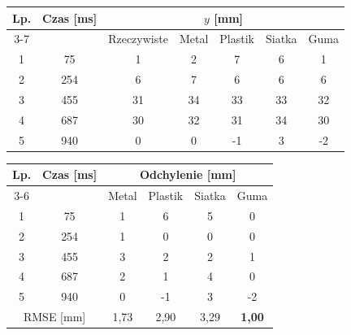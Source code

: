 \begin{tabular}{cc c cccc}
\toprule
Lp. & Czas [ms] & \multicolumn{5}{c}{$y$ [mm]} \\
\cmidrule(lr){3-7}
 &  & Rzeczywiste & Metal & Plastik & Siatka & Guma \\
\midrule
1 & 75 & 1 & 2 & 7 & 6 & 1 \\
2 & 254 & 6 & 7 & 6 & 6 & 6 \\
3 & 455 & 31 & 34 & 33 & 33 & 32 \\
4 & 687 & 30 & 32 & 31 & 34 & 30 \\
5 & 940 & 0 & 0 & -1 & 3 & -2 \\
\bottomrule
\end{tabular}

\bigskip

\begin{tabular}{cc cccc}
\toprule
Lp. & Czas [ms] & \multicolumn{4}{c}{Odchylenie [mm]} \\
\cmidrule(lr){3-6}
 &  & Metal & Plastik & Siatka & Guma \\
\midrule
1 & 75 & 1 & 6 & 5 & 0 \\
2 & 254 & 1 & 0 & 0 & 0 \\
3 & 455 & 3 & 2 & 2 & 1 \\
4 & 687 & 2 & 1 & 4 & 0 \\
5 & 940 & 0 & -1 & 3 & -2 \\
\midrule
\multicolumn{2}{c}{RMSE [mm]} & 1,73 & 2,90 & 3,29 & \textbf{1,00} \\
\bottomrule
\end{tabular}
